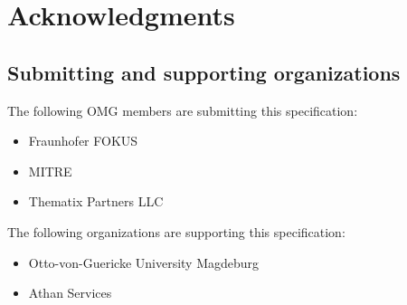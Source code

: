 \documentclass[10pt,fleqn,final]{scrreprt}
\begin{document}

\section{Acknowledgments}
\subsection{Submitting and supporting organizations}
The following  OMG  members are submitting this specification:
	\begin{itemize}
		\item Fraunhofer FOKUS
		\item MITRE		
		\item Thematix Partners LLC
	\end{itemize}
The following organizations are supporting this specification: 
	\begin{itemize}
		\item Otto-von-Guericke University Magdeburg 
		\item Athan Services 
	\end{itemize}
\end{document}

